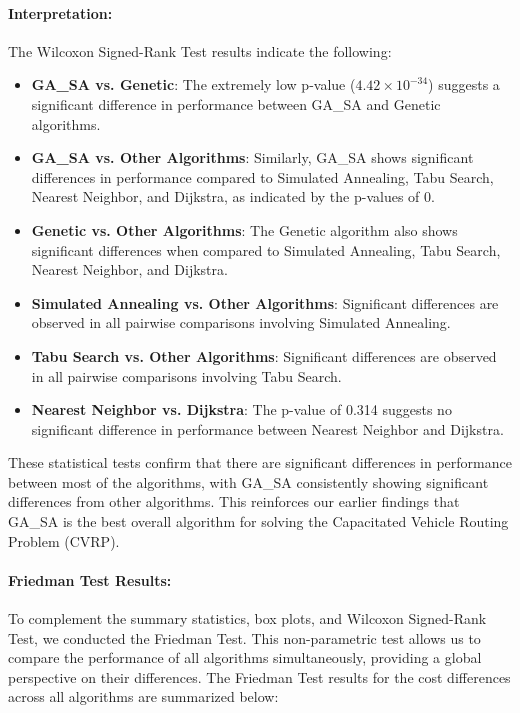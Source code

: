 \documentclass{article}
\begin{document}
    \paragraph{Interpretation:}
    The Wilcoxon Signed-Rank Test results indicate the following:

    \begin{itemize}
        \item \textbf{GA\_SA vs. Genetic}: The extremely low p-value (\(4.42 \times 10^{-34}\)) suggests a significant difference in performance between GA\_SA and Genetic algorithms.
        \item \textbf{GA\_SA vs. Other Algorithms}: Similarly, GA\_SA shows significant differences in performance compared to Simulated Annealing, Tabu Search, Nearest Neighbor, and Dijkstra, as indicated by the p-values of 0.
        \item \textbf{Genetic vs. Other Algorithms}: The Genetic algorithm also shows significant differences when compared to Simulated Annealing, Tabu Search, Nearest Neighbor, and Dijkstra.
        \item \textbf{Simulated Annealing vs. Other Algorithms}: Significant differences are observed in all pairwise comparisons involving Simulated Annealing.
        \item \textbf{Tabu Search vs. Other Algorithms}: Significant differences are observed in all pairwise comparisons involving Tabu Search.
        \item \textbf{Nearest Neighbor vs. Dijkstra}: The p-value of 0.314 suggests no significant difference in performance between Nearest Neighbor and Dijkstra.
    \end{itemize}

    These statistical tests confirm that there are significant differences in performance between most of the algorithms, with GA\_SA consistently showing significant differences from other algorithms. This reinforces our earlier findings that GA\_SA is the best overall algorithm for solving the Capacitated Vehicle Routing Problem (CVRP).

    \paragraph{Friedman Test Results:}
    To complement the summary statistics, box plots, and Wilcoxon Signed-Rank Test, we conducted the Friedman Test.
    This non-parametric test allows us to compare the performance of all algorithms simultaneously, providing a global perspective on their differences.
    The Friedman Test results for the cost differences across all algorithms are summarized below:
\end{document}
